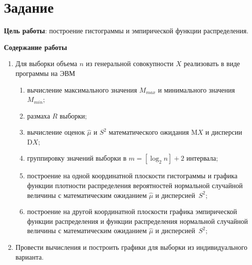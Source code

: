 \chapter{Задание}

\textbf{Цель работы}: построение гистограммы и эмпирической функции распределения.

\textbf{Содержание работы}

\begin{enumerate}
	\item Для выборки объема $n$ из генеральной совокупности $X$ реализовать в
	виде программы на ЭВМ
	\begin{enumerate}[label={\asbuk*)}]
		\item вычисление максимального значения $M_{max}$ и минимального значения $M_{min}$;
		\item размаха $R$ выборки;
		\item вычисление оценок $\hat{\mu}$ и $S^2$ математического ожидания $\mathrm{M}X$ и дисперсии $\mathrm{D}X$;
		\item группировку значений выборки в $m = [\log_2 n] + 2$ интервала;
		\item построение на одной координатной плоскости гистограммы и графика функции плотности распределения вероятностей нормальной случайной величины с математическим ожиданием $\hat{\mu}$ и дисперсией~$S^2$;
		\item построение на другой координатной плоскости графика эмпирической функции распределения и функции распределения нормальной случайной величины с математическим ожиданием $\hat{\mu}$ и дисперсией~$S^2$;
	\end{enumerate}
	\item Провести вычисления и построить графики для выборки из индивидуального	варианта.
\end{enumerate}
